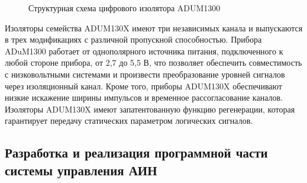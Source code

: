         \begin{figure}[h!]
            \caption{Структурная схема цифрового изолятора ADUM1300}
            \label{fig:adum1300}
        \end{figure}

        Изоляторы семейства ADUM130X имеют три независимых канала и выпускаются
        в трех модификациях с различной пропускной способностью. Прибора
        ADuM1300 работает от однополярного источника питания, подключенного к
        любой стороне прибора, от 2,7 до 5,5 В, что позволяет обеспечить
        совместимость с низковольтными системами и произвести преобразование
        уровней сигналов через изоляционный канал. Кроме того, приборы ADUM130X
        обеспечивают низкие искажение ширины импульсов и временное
        рассогласование каналов.  Изоляторы ADUM130X имеют запатентованную
        функцию регенерации, которая гарантирует передачу статических
        параметром логических сигналов.

    \subsection{Разработка и реализация программной части системы управления АИН}
